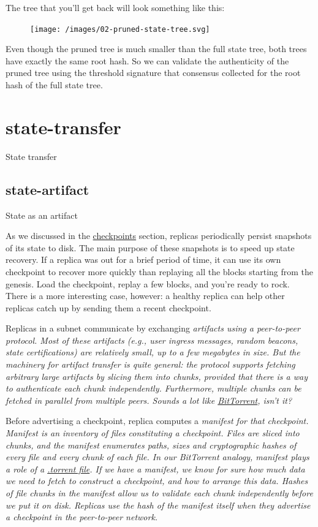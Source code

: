 \documentclass{article}
\begin{document}
The tree that you'll get back will look something like this:

\begin{figure}[grayscale-diagram]
\texttt{[image: /images/02-pruned-state-tree.svg]}
\end{figure}

Even though the pruned tree is much smaller than the full state tree, both trees have exactly the same root hash.
So we can validate the authenticity of the pruned tree using the threshold signature that consensus collected for the root hash of the full state tree.

\section{state-transfer}{State transfer}

\subsection{state-artifact}{State as an artifact}

As we discussed in the \href{#checkpoints}{checkpoints} section, replicas periodically persist snapshots of its state to disk.
The main purpose of these snapshots is to speed up state recovery.
If a replica was out for a brief period of time, it can use its own checkpoint to recover more quickly than replaying all the blocks starting from the genesis.
Load the checkpoint, replay a few blocks, and you're ready to rock.
There is a more interesting case, however: a healthy replica can help other replicas catch up by sending them a recent checkpoint.

Replicas in a subnet communicate by exchanging \em{artifacts} using a peer-to-peer protocol.
Most of these artifacts (e.g., user ingress messages, random beacons, state certifications) are relatively small, up to a few megabytes in size.
But the machinery for artifact transfer is quite general: the protocol supports fetching arbitrary large artifacts by slicing them into chunks, provided that there is a way to authenticate each chunk independently.
Furthermore, multiple chunks can be fetched in parallel from multiple peers.
Sounds a lot like \href{https://en.wikipedia.org/wiki/BitTorrent}{BitTorrent}, isn't it?

Before advertising a checkpoint, replica computes a \em{manifest} for that checkpoint.
Manifest is an inventory of files constituting a checkpoint.
Files are sliced into chunks, and the manifest enumerates paths, sizes and cryptographic hashes of every file and every chunk of each file.
In our BitTorrent analogy, manifest plays a role of a \href{https://en.wikipedia.org/wiki/Torrent_file}{.torrent file}.
If we have a manifest, we know for sure how much data we need to fetch to construct a checkpoint, and how to arrange this data.
Hashes of file chunks in the manifest allow us to validate each chunk independently before we put it on disk.
Replicas use the hash of the manifest itself when they advertise a checkpoint in the peer-to-peer network.
\end{document}
